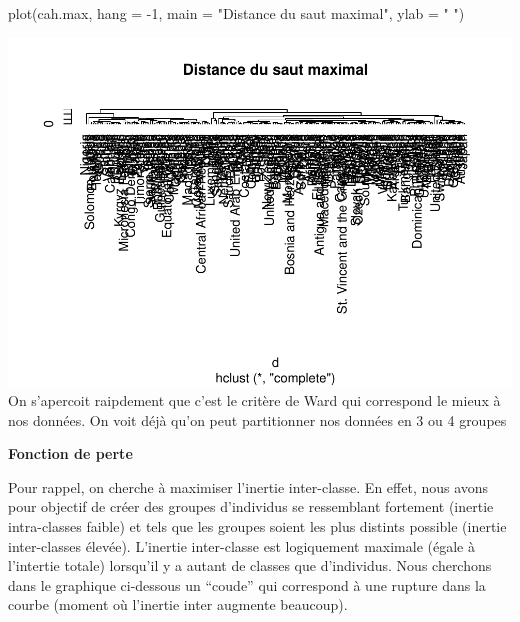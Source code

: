 \documentclass[
]{article}
\newenvironment{Shaded}{}{}
\newcommand{\AttributeTok}[1]{#1}
\newcommand{\DecValTok}[1]{#1}
\newcommand{\FunctionTok}[1]{#1}
\newcommand{\NormalTok}[1]{#1}
\newcommand{\SpecialCharTok}[1]{\textcolor[rgb]{0.00,0.50,0.50}{#1}}
\newcommand{\StringTok}[1]{\textcolor[rgb]{0.00,0.50,0.50}{#1}}
\begin{document}
\begin{Shaded}
\begin{Highlighting}[]
\FunctionTok{plot}\NormalTok{(cah.max, }\AttributeTok{hang =} \SpecialCharTok{{-}}\DecValTok{1}\NormalTok{, }\AttributeTok{main =} \StringTok{"Distance du saut maximal"}\NormalTok{, }\AttributeTok{ylab =} \StringTok{" "}\NormalTok{)}
\end{Highlighting}
\end{Shaded}

\includegraphics{projet_classification_files/figure-latex/unnamed-chunk-15-1.pdf}
On s'apercoit raipdement que c'est le critère de Ward qui correspond le
mieux à nos données. On voit déjà qu'on peut partitionner nos données en
3 ou 4 groupes

\textbf{Fonction de perte}

Pour rappel, on cherche à maximiser l'inertie inter-classe. En effet,
nous avons pour objectif de créer des groupes d'individus se ressemblant
fortement (inertie intra-classes faible) et tels que les groupes soient
les plus distints possible (inertie inter-classes élevée). L'inertie
inter-classe est logiquement maximale (égale à l'intertie totale)
lorsqu'il y a autant de classes que d'individus. Nous cherchons dans le
graphique ci-dessous un ``coude'' qui correspond à une rupture dans la
courbe (moment où l'inertie inter augmente beaucoup).

\begin{Shaded}
\end{Shaded}
\end{document}

